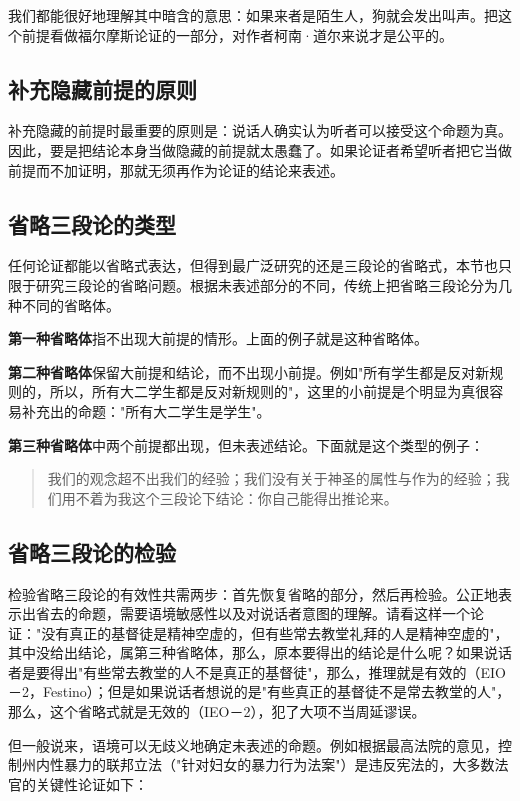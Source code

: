 我们都能很好地理解其中暗含的意思：如果来者是陌生人，狗就会发出叫声。把这个前提看做福尔摩斯论证的一部分，对作者柯南·道尔来说才是公平的。

\subsection{补充隐藏前提的原则}

补充隐藏的前提时最重要的原则是：说话人确实认为听者可以接受这个命题为真。因此，要是把结论本身当做隐藏的前提就太愚蠢了。如果论证者希望听者把它当做前提而不加证明，那就无须再作为论证的结论来表述。

\subsection{省略三段论的类型}

任何论证都能以省略式表达，但得到最广泛研究的还是三段论的省略式，本节也只限于研究三段论的省略问题。根据未表述部分的不同，传统上把省略三段论分为几种不同的省略体。

\textbf{第一种省略体}指不出现大前提的情形。上面的例子就是这种省略体。

\textbf{第二种省略体}保留大前提和结论，而不出现小前提。例如"所有学生都是反对新规则的，所以，所有大二学生都是反对新规则的"，这里的小前提是个明显为真很容易补充出的命题："所有大二学生是学生"。

\textbf{第三种省略体}中两个前提都出现，但未表述结论。下面就是这个类型的例子：

\begin{quote}
我们的观念超不出我们的经验；我们没有关于神圣的属性与作为的经验；我们用不着为我这个三段论下结论：你自己能得出推论来。\cite{hume1748}
\end{quote}

\subsection{省略三段论的检验}

检验省略三段论的有效性共需两步：首先恢复省略的部分，然后再检验。公正地表示出省去的命题，需要语境敏感性以及对说话者意图的理解。请看这样一个论证："没有真正的基督徒是精神空虚的，但有些常去教堂礼拜的人是精神空虚的"，其中没给出结论，属第三种省略体，那么，原本要得出的结论是什么呢？如果说话者是要得出"有些常去教堂的人不是真正的基督徒"，那么，推理就是有效的（EIO－2，Festino）；但是如果说话者想说的是"有些真正的基督徒不是常去教堂的人"，那么，这个省略式就是无效的（IEO－2），犯了大项不当周延谬误。

但一般说来，语境可以无歧义地确定未表述的命题。例如根据最高法院的意见，控制州内性暴力的联邦立法（"针对妇女的暴力行为法案"）是违反宪法的，大多数法官的关键性论证如下：

